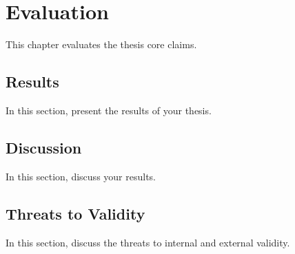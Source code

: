 \chapter{Evaluation}\label{ch:evaluation}

This chapter evaluates the thesis core claims.

\section{Results}\label{sec:results}

In this section, present the results of your thesis.

\section{Discussion}\label{sec:discussion}

In this section, discuss your results.

\section{Threats to Validity}\label{sec:threats}

In this section, discuss the threats to internal and external validity.
